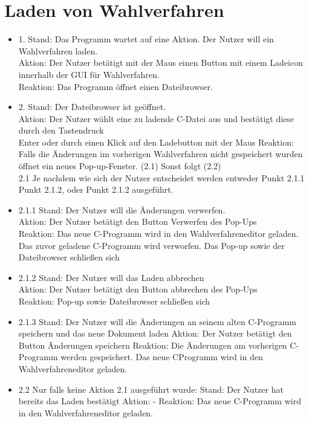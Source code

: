 \documentclass[a4paper]{scrreprt}
\begin{document}
\section{Laden von Wahlverfahren}
\begin{itemize}

\item 1. Stand: Das Programm wartet auf eine Aktion. Der Nutzer will ein Wahlverfahren laden.\\
Aktion: Der Nutzer betätigt mit der Maus einen Button mit einem Ladeicon innerhalb der GUI für Wahlverfahren.\\
Reaktion: Das Programm öffnet einen Dateibrowser.\\

\item 2. Stand: Der Dateibrowser ist geöffnet.\\
Aktion: Der Nutzer wählt eine zu ladende C-Datei aus und bestätigt diese durch den Tastendruck\\
Enter oder durch einen Klick auf den Ladebutton mit der Maus
Reaktion: Falls die Änderungen im vorherigen Wahlverfahren nicht gespeichert wurden öffnet ein neues Pop-up-Fenster. (2.1) Sonst folgt (2.2)\\

2.1 Je nachdem wie sich der Nutzer entscheidet werden entweder Punkt 2.1.1 Punkt 2.1.2, oder Punkt 2.1.2 ausgeführt.

\item 2.1.1 Stand: Der Nutzer will die Änderungen verwerfen.\\
Aktion: Der Nutzer betätigt den Button Verwerfen des Pop-Ups\\
Reaktion: Das neue C-Programm wird in den Wahlverfahreneditor geladen. Das zuvor
geladene C-Programm wird verworfen. Das Pop-up sowie der Dateibrowser
schließen sich\\

\item 2.1.2 Stand: Der Nutzer will das Laden abbrechen\\
Aktion: Der Nutzer betätigt den Button abbrechen des Pop-Ups\\
Reaktion: Pop-up sowie Dateibrowser schließen sich\\

\item 2.1.3 Stand: Der Nutzer will die Änderungen an seinem alten C-Programm speichern und das
neue Dokument laden
Aktion: Der Nutzer betätigt den Button Änderungen speichern
Reaktion: Die Änderungen am vorherigen C-Programm werden gespeichert. Das neue CProgramm
wird in den Wahlverfahreneditor geladen.

\item 2.2
Nur falls keine Aktion 2.1 ausgeführt wurde:
Stand: Der Nutzer hat bereits das Laden bestätigt
Aktion: -
Reaktion: Das neue C-Programm wird in den Wahlverfahreneditor geladen.

\end{itemize}
\end{document}
